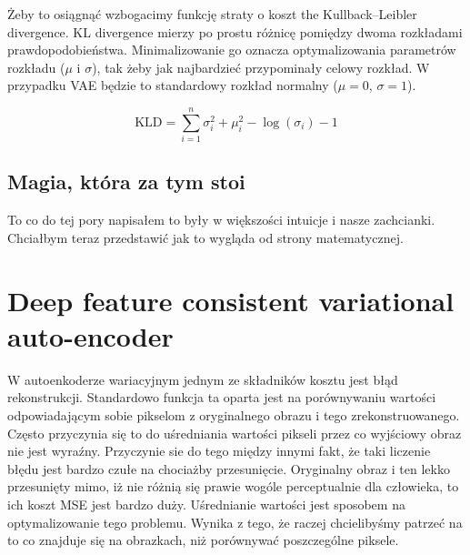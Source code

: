 Żeby to osiągnąć wzbogacimy funkcję straty o koszt the Kullback–Leibler divergence. KL divergence mierzy po prostu różnicę pomiędzy dwoma rozkładami prawdopodobieństwa. Minimalizowanie go oznacza optymalizowania parametrów rozkładu ($\mu$ i $\sigma$), tak żeby jak najbardzieć przypominały celowy rozkład. W przypadku VAE będzie to standardowy rozkład normalny ($\mu = 0$,  $\sigma = 1$).

$$
\mathrm { KLD } = \sum _ { i = 1 } ^ { n } \sigma _ { i } ^ { 2 } + \mu _ { i } ^ { 2 } - \log \left( \sigma _ { i } \right) - 1
$$

\subsection{Magia, która za tym stoi}

To co do tej pory napisałem to były w większości intuicje i nasze zachcianki. Chciałbym teraz przedstawić jak to wygląda od strony matematycznej.


%

\section{Deep feature consistent variational auto-encoder}

W autoenkoderze wariacyjnym jednym ze składników kosztu jest błąd rekonstrukcji. Standardowo funkcja ta oparta jest na porównywaniu wartości odpowiadającym sobie pikselom z oryginalnego obrazu i tego zrekonstruowanego. Często przyczynia się to do uśredniania wartości pikseli przez co wyjściowy obraz nie jest wyraźny. Przyczynie sie do tego między innymi fakt, że taki liczenie błędu jest bardzo czułe na chociażby przesunięcie. Oryginalny obraz i ten lekko przesunięty mimo, iż nie różnią się prawie wogóle perceptualnie dla człowieka, to ich koszt MSE jest bardzo duży. Uśrednianie wartości jest sposobem na optymalizowanie tego problemu. Wynika z tego, że raczej chcielibyśmy patrzeć na to co znajduje się na obrazkach, niż porównywać poszczególne piksele.


